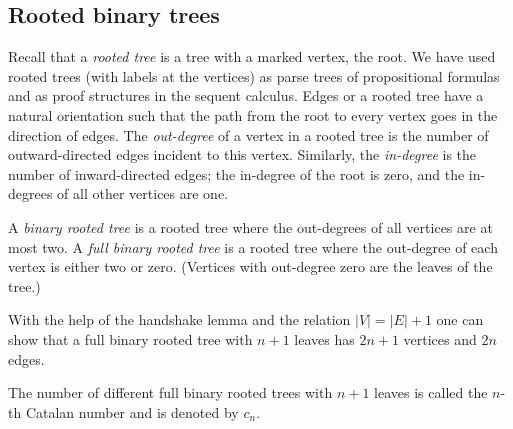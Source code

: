 \begin{page}
\setcounter{section}{4}
\setcounter{subsection}{1}
\setcounter{dfn}{0}
\label{portion:965}

\subsection{Rooted binary trees}
Recall that a \emph{rooted tree} is a tree with a marked vertex, the root.
We have used rooted trees (with labels at the vertices) as parse trees of propositional formulas
and as proof structures in the sequent calculus.
Edges or a rooted tree have a natural orientation such that the path from the root to every vertex goes in the direction of edges.
The \emph{out-degree} of a vertex in a rooted tree is the number of outward-directed edges incident to this vertex.
Similarly, the \emph{in-degree} is the number of inward-directed edges; the in-degree of the root is zero, and the in-degrees of all other vertices are one.

A \emph{binary rooted tree} is a rooted tree where the out-degrees of all vertices are at most two.
A \emph{full binary rooted tree} is a rooted tree where the out-degree of each vertex is either two or zero.
(Vertices with out-degree zero are the leaves of the tree.)

With the help of the handshake lemma and the relation $|V| = |E| + 1$ one can show that
a full binary rooted tree with $n+1$ leaves has $2n+1$ vertices and $2n$ edges.


\end{page}

\begin{page}
\setcounter{section}{4}
\setcounter{subsection}{1}
\setcounter{dfn}{1}
\label{portion:967}

\begin{dfn}
The number of different full binary rooted trees with $n+1$ leaves is called the $n$-th Catalan number and is denoted by $c_n$.
\end{dfn}

\end{page}

